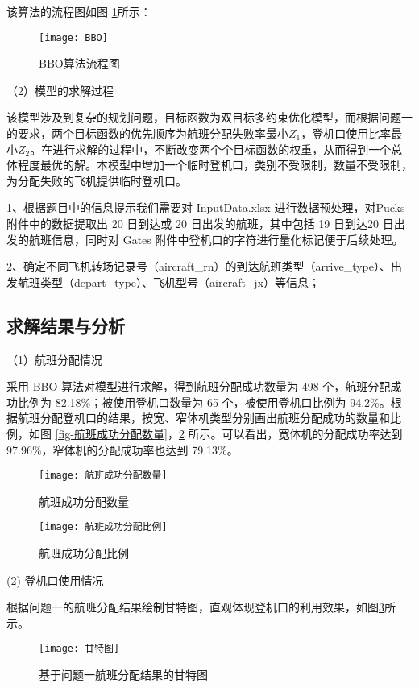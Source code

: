\documentclass[bwprint]{gmcmthesis}
\numberwithin{figure}{section}
\begin{document}
该算法的流程图如图 \ref{fig-BBO}所示：
\begin{figure}[h]
\centering
\texttt{[image: BBO]}
\caption{BBO算法流程图} \label{fig-BBO}
\end{figure}

\noindent（2）模型的求解过程 

该模型涉及到复杂的规划问题，目标函数为双目标多约束优化模型，而根据问题一的要求，两个目标函数的优先顺序为航班分配失败率最小$Z_1$，登机口使用比率最小$Z_2$。在进行求解的过程中，不断改变两个个目标函数的权重，从而得到一个总体程度最优的解。本模型中增加一个临时登机口，类别不受限制，数量不受限制，为分配失败的飞机提供临时登机口。

1、根据题目中的信息提示我们需要对 InputData.xlsx 进行数据预处理，对Pucks 附件中的数据提取出 20 日到达或 20 日出发的航班，其中包括 19 日到达20 日出发的航班信息，同时对 Gates 附件中登机口的字符进行量化标记便于后续处理。

2、确定不同飞机转场记录号（aircraft\_rn）的到达航班类型（arrive\_type）、出发航班类型（depart\_type）、飞机型号（aircraft\_jx）等信息；

\subsection{求解结果与分析}
\noindent（1）航班分配情况  \par
采用 BBO 算法对模型进行求解，得到航班分配成功数量为 498 个，航班分配成功比例为 82.18\%；被使用登机口数量为 65 个，被使用登机口比例为 94.2\%。根据航班分配登机口的结果，按宽、窄体机类型分别画出航班分配成功的数量和比例，如图 \ref{fig-航班成功分配数量}，\ref{fig-航班成功分配比例} 所示。可以看出，宽体机的分配成功率达到 97.96\%，窄体机的分配成功率也达到 79.13\%。
\begin{figure}[h]

\begin{minipage}{0.45\textwidth}
\centering
\texttt{[image: 航班成功分配数量]}
\caption{航班成功分配数量} \label{fig-航班成功分配数量}
\end{minipage}
\begin{minipage}{0.45\textwidth}
\centering
\texttt{[image: 航班成功分配比例]}
\caption{航班成功分配比例} \label{fig-航班成功分配比例}
\end{minipage}

\end{figure}

\noindent (2) 登机口使用情况 

根据问题一的航班分配结果绘制甘特图，直观体现登机口的利用效果，如图\ref{fig-甘特图}所示。
\begin{landscape}
\begin{figure}
\centering
\texttt{[image: 甘特图]}
\caption{基于问题一航班分配结果的甘特图} \label{fig-甘特图}
\end{figure}
\end{landscape}
\end{document}
